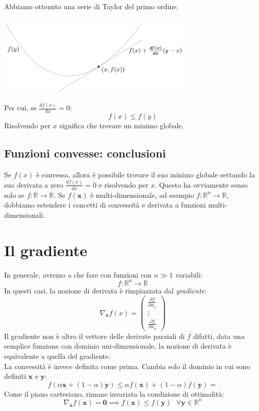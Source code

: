 \documentclass{article}
\begin{document}
                Abbiamo ottenuto una serie di Taylor del primo ordine.
                \begin{center}\includegraphics[width=9.2cm]{taylor.png}\end{center}
                Per cui, se $\frac{df(x)}{dx}=0$:
                \[f(x) \leq f(y)\]
                Risolvendo per $x$ significa che trovare un minimo globale.
            \subsection{Funzioni convesse: conclusioni}
                Se $f(x)$ è convessa, allora è possibile trovare il suo minimo globale settando la sua derivata a zero
                $\frac{df(x)}{dx}=0$ e risolvendo per $x$. Questo ha ovviamente senso solo se $f : \mathbb{R} \to \mathbb{R}$.
                Se $f(\mathbf{x})$ è multi-dimensionale, ad esempio $f: \mathbb{R}^n \to \mathbb{R}$, dobbiamo estendere i concetti di 
                convessità e derivata a funzioni multi-dimensionali.

    \section{Il gradiente}
        In generale, avremo a che fare con funzioni con $n \gg 1$ variabili:
                \[f:\mathbb{R}^n \to \mathbb{R}\]
        In questi casi, la nozione di derivata è rimpiazzata dal \emph{gradiente}:
                \[\nabla_\mathbf{x}f(x) = \begin{pmatrix}
                    \frac{\partial f}{\partial x_1} \\
                    \vdots \\
                    \frac{\partial f}{\partial x_n}
                \end{pmatrix} \]
        Il gradiente non è altro il vettore delle derivate parziali di $f$ difatti, data una semplice funzione con dominio uni-dimensionale, 
        la nozione di derivata è equivalente a quella del gradiente.\\
        La convessità è invece definita come prima. Cambia solo il dominio in cui sono definiti $\mathbf{x}$ e $\mathbf{y}$:
        \[f(\alpha \mathbf{x} + (1-\alpha)\mathbf{y}) \leq \alpha f(\mathbf{x}) + (1-\alpha)f(\mathbf{y}) =\]
        Come il piano cartesiano, rimane invariata la condizione di ottimalità:
        \[\nabla_\mathbf{x} f(\mathbf{x}) = \mathbf{0} \implies f(\mathbf{x}) \leq f(\mathbf{y}) \text{ }\forall \mathbf{y} \in \mathbb{R}^n\]
        
\end{document}

